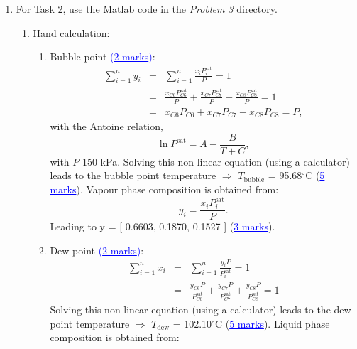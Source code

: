 \documentclass[12pts,a4paper,amsmath,amssymb,floatfix]{article}%
\newcommand{\frc}{\displaystyle\frac}
\newcommand{\blue}{\textcolor{blue}}
\begin{document}
\begin{enumerate}[label=\bfseries Problem \arabic*:]
   \item For Task 2, use the Matlab code in the {\it Problem 3} directory.
      \begin{enumerate}[label=\bfseries Task \arabic*:]
%
         \item Hand calculation:
            \begin{enumerate}
               \item Bubble point \blue{(\underline{2 marks})}:
                    \begin{eqnarray}
                        \sum\limits_{i=1}^{n} y_{i} &=& \sum\limits_{i=1}^{n} \frc{x_{i}P_{i}^{\text{sat}}}{P} = 1 \nonumber \\
                        &=& \frc{x_{C6}P_{C6}^{\text{sat}}}{P} + \frc{x_{C7}P_{C7}^{\text{sat}}}{P} + \frc{x_{C8}P_{C8}^{\text{sat}}}{P} = 1 \nonumber \\
                                                 &=& x_{C6}P_{C6} + x_{C7}P_{C7} + x_{C8}P_{C8} = P, \nonumber 
                    \end{eqnarray}
                    with the Antoine relation,
                      \begin{displaymath}
                         \ln{P^{\text{sat}}} = A - \frc{B}{T+C},
                      \end{displaymath}
                     with $P$ 150 kPa. Solving this non-linear equation (using a calculator) leads to the bubble point temperature $\Longrightarrow$ $T_{\text{bubble}}$ = 95.68$^{\circ}$C (\blue{\underline{5 marks}}).  Vapour phase composition is obtained from:
                      \begin{displaymath}
                         y_{i} = \frc{x_{i}P_{i}^{\text{sat}}}{P}.
                      \end{displaymath}
                      Leading to y = [ 0.6603, 0.1870, 0.1527 ] (\blue{\underline{3 marks}}).
%
               \item Dew point \blue{(\underline{2 marks})}:
                    \begin{eqnarray}
                        \sum\limits_{i=1}^{n} x_{i} &=& \sum\limits_{i=1}^{n} \frc{y_{i}P}{P_{i}^{\text{sat}}} = 1 \nonumber \\
                                                 &=& \frc{y_{C6}P}{P_{C6}^{\text{sat}}} + \frc{y_{C7}P}{P_{C7}^{\text{sat}}} + \frc{y_{C8}P}{P_{C8}^{\text{sat}}} = 1 \nonumber 
                    \end{eqnarray}
                    Solving this non-linear equation (using a calculator) leads to the dew point temperature $\Longrightarrow$ $T_{\text{dew}}$ = 102.10$^{\circ}$C (\blue{\underline{5 marks}}).  Liquid phase composition is obtained from:

\end{enumerate}
\end{enumerate}
\end{enumerate}
\end{document}
